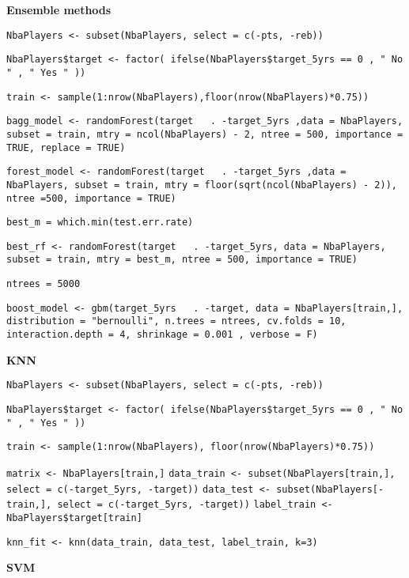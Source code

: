 \noindent
\textbf{Ensemble methods}

\begin{center}
\texttt{NbaPlayers <- subset(NbaPlayers, select = c(-pts, -reb))}

\texttt{NbaPlayers\$target <- factor( ifelse(NbaPlayers\$target\_5yrs == 0 , " No " , " Yes " ))}

\texttt{train <- sample(1:nrow(NbaPlayers),floor(nrow(NbaPlayers)*0.75))}

\texttt{bagg\_model <- randomForest(target ~ . -target\_5yrs ,data = NbaPlayers, subset = train,	mtry = ncol(NbaPlayers) - 2, ntree = 500, importance = TRUE, replace = TRUE)}

\texttt{forest\_model <- randomForest(target ~ . -target\_5yrs ,data = NbaPlayers, subset = train,	mtry = floor(sqrt(ncol(NbaPlayers) - 2)), ntree =500, importance = TRUE)}

\texttt{best\_m = which.min(test.err.rate)}

\texttt{best\_rf <- randomForest(target ~ . -target\_5yrs, data = NbaPlayers, subset = train, mtry = best\_m, ntree = 500, importance = TRUE)}

\texttt{ntrees = 5000}

\texttt{boost\_model <- gbm(target\_5yrs ~ . -target, data = NbaPlayers[train,], distribution = "bernoulli", n.trees = ntrees, cv.folds = 10, interaction.depth = 4, shrinkage = 0.001 , verbose = F)}
\end{center}
	
\noindent
\textbf{KNN}

\begin{center}
\texttt{NbaPlayers <- subset(NbaPlayers, select = c(-pts, -reb))}

\texttt{NbaPlayers\$target <- factor( ifelse(NbaPlayers\$target\_5yrs == 0 , " No " , " Yes " ))}

\texttt{train <- sample(1:nrow(NbaPlayers), floor(nrow(NbaPlayers)*0.75))}

\texttt{matrix <- NbaPlayers[train,]}
\texttt{data\_train <- subset(NbaPlayers[train,], select = c(-target\_5yrs, -target))} 
\texttt{data\_test <- subset(NbaPlayers[-train,], select = c(-target\_5yrs, -target))}
\texttt{label\_train <- NbaPlayers\$target[train]}

\texttt{knn\_fit <- knn(data\_train, data\_test, label\_train, k=3)}
\end{center}
	
\noindent
\textbf{SVM}

